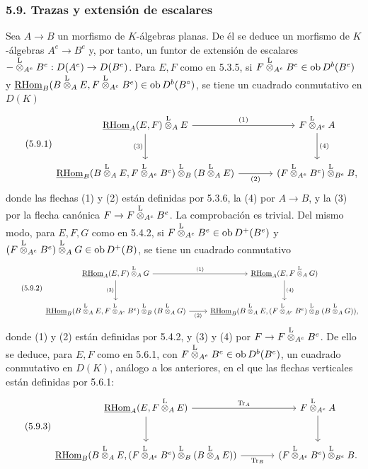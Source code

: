 \subsubsection*{5.9. Trazas y extensión de escalares}

Sea $A\to B$ un morfismo de $K$-álgebras planas. De él se deduce un morfismo de $K$-álgebras $A^e\to B^e$ y, por tanto, un funtor de extensión de escalares $-\overset{\mathrm L}{\otimes}_{A^e}B^e:D(A^e)\to D(B^e)$. Para $E,F$ como en 5.3.5, si $F\overset{\mathrm L}{\otimes}_{A^e}B^e\in\operatorname{ob} D^b(B^e)$ y $\underline{\mathrm{RHom}}_B(B\overset{\mathrm L}{\otimes}_AE,F\overset{\mathrm L}{\otimes}_{A^e}B^e)\in\operatorname{ob} D^b(B^\circ)$, se tiene un cuadrado conmutativo en $D(K)$
\begin{equation}\tag{5.9.1}
\begin{tikzcd}[column sep=large,row sep=large]
\uRHom_A(E,F)\lten_AE \arrow[r,"(1)"] \arrow[d,"(3)"'] & F\lten_{A^e}A \arrow[d,"(4)"]\\
\uRHom_B(B\lten_AE,F\lten_{A^e}B^e)\lten_B(B\lten_AE) \arrow[r,"(2)"'] & (F\lten_{A^e}B^e)\lten_{B^e}B,
\end{tikzcd}
\end{equation}
donde las flechas (1) y (2) están definidas por 5.3.6, la (4) por $A\to B$, y la (3) por la flecha canónica $F\to F\overset{\mathrm L}{\otimes}_{A^e}B^e$. La comprobación es trivial. Del mismo modo, para $E,F,G$ como en 5.4.2, si $F\overset{\mathrm L}{\otimes}_{A^e}B^e\in\operatorname{ob} D^+(B^e)$ y $(F\overset{\mathrm L}{\otimes}_{A^e}B^e)\overset{\mathrm L}{\otimes}_AG\in\operatorname{ob} D^+(B)$, se tiene un cuadrado conmutativo
\begin{equation}\tag{5.9.2}
\begin{tikzcd}[column sep=normal,row sep=large]
\uRHom_A(E,F)\lten_AG \arrow[r,"(1)"] \arrow[d,"(3)"'] & \uRHom_A(E,F\lten_AG) \arrow[d,"(4)"]\\
\uRHom_B(B\lten_AE,F\lten_{A^e}B^e)\lten_B(B\lten_AG) \arrow[r,"(2)"'] & \uRHom_B(B\lten_AE,(F\lten_{A^e}B^e)\lten_B(B\lten_AG)),
\end{tikzcd}
\end{equation}
donde (1) y (2) están definidas por 5.4.2, y (3) y (4) por $F\to F\overset{\mathrm L}{\otimes}_{A^e}B^e$. De ello se deduce, para $E,F$ como en 5.6.1, con $F\overset{\mathrm L}{\otimes}_{A^e}B^e\in\operatorname{ob} D^b(B^e)$, un cuadrado conmutativo en $D(K)$, análogo a los anteriores, en el que las flechas verticales están definidas por 5.6.1:
\begin{equation}\tag{5.9.3}
\begin{tikzcd}[column sep=large,row sep=large]
\uRHom_A(E,F\lten_AE) \arrow[r,"\Tr_A"] \arrow[d] & F\lten_{A^e}A \arrow[d]\\
\uRHom_B(B\lten_AE,(F\lten_{A^e}B^e)\lten_B(B\lten_AE)) \arrow[r,"\Tr_B"'] & (F\lten_{A^e}B^e)\lten_{B^e}B.
\end{tikzcd}
\end{equation}
